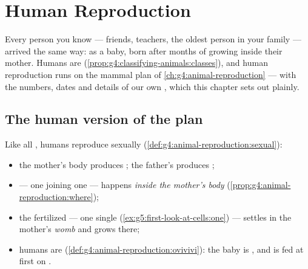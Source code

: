 \chapter{Human Reproduction}\label{ch:g5:human-reproduction}

Every person you know --- friends, teachers, the oldest person
in your family --- arrived the same way: as a baby, born after
months of growing inside their mother. Humans are 
(\cref{prop:g4:classifying-animals:classes}), and human
reproduction runs on the mammal plan of
\cref{ch:g4:animal-reproduction} --- with the numbers, dates
and details of our own , which this chapter sets out
plainly.

\section{The human version of the plan}

\begin{proposition}\label{prop:g5:human-reproduction:plan}
Like all , humans reproduce sexually
(\cref{def:g4:animal-reproduction:sexual}):
\begin{itemize}
  \item the mother's body produces \emph{}; the
        father's produces \emph{};
  \item {} --- one  joining one 
        --- happens \emph{inside the mother's body}
        (\cref{prop:g4:animal-reproduction:where});
  \item the fertilized  --- one single 
        (\cref{ex:g5:first-look-at-cells:one}) --- settles in
        the mother's \emph{womb} and grows there;
  \item humans are 
        (\cref{def:g4:animal-reproduction:ovivivi}): the baby
        is , and is fed at first on .
\end{itemize}
\end{proposition}
\admitted

